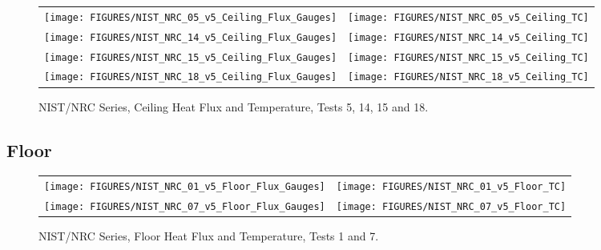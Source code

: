 \begin{figure}[p]
\begin{tabular*}{\textwidth}{l@{\extracolsep{\fill}}r}
\texttt{[image: FIGURES/NIST\_NRC\_05\_v5\_Ceiling\_Flux\_Gauges]} &
\texttt{[image: FIGURES/NIST\_NRC\_05\_v5\_Ceiling\_TC]} \\
\texttt{[image: FIGURES/NIST\_NRC\_14\_v5\_Ceiling\_Flux\_Gauges]} &
\texttt{[image: FIGURES/NIST\_NRC\_14\_v5\_Ceiling\_TC]} \\
\texttt{[image: FIGURES/NIST\_NRC\_15\_v5\_Ceiling\_Flux\_Gauges]} &
\texttt{[image: FIGURES/NIST\_NRC\_15\_v5\_Ceiling\_TC]} \\
\texttt{[image: FIGURES/NIST\_NRC\_18\_v5\_Ceiling\_Flux\_Gauges]} &
\texttt{[image: FIGURES/NIST\_NRC\_18\_v5\_Ceiling\_TC]}
\end{tabular*}
\caption{NIST/NRC Series, Ceiling Heat Flux and Temperature, Tests 5, 14, 15 and 18.}
\label{NIST_NRC_Ceiling_4}
\end{figure}

\clearpage



\subsection{Floor}

\vspace{2in}


\begin{figure}[h!]
\begin{tabular*}{\textwidth}{l@{\extracolsep{\fill}}r}
\texttt{[image: FIGURES/NIST\_NRC\_01\_v5\_Floor\_Flux\_Gauges]} &
\texttt{[image: FIGURES/NIST\_NRC\_01\_v5\_Floor\_TC]} \\
\texttt{[image: FIGURES/NIST\_NRC\_07\_v5\_Floor\_Flux\_Gauges]} &
\texttt{[image: FIGURES/NIST\_NRC\_07\_v5\_Floor\_TC]}

\end{tabular*}
\caption{NIST/NRC Series, Floor Heat Flux and Temperature, Tests 1 and 7.}
\label{NIST_NRC_Floor_1}
\end{figure}

